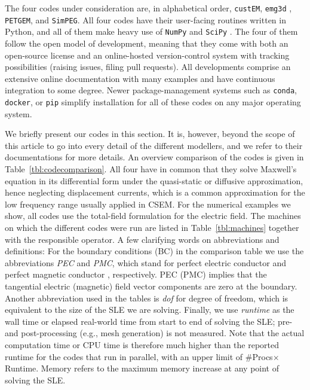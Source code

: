 \documentclass[extra, camera,%
]{gji}
\newcommand{\emg}[2]{\texttt{emg#1#2}\xspace}
\newcommand{\simpeg}{\texttt{SimPEG}\xspace}
\newcommand{\custem}{\texttt{custEM}\xspace}
\newcommand{\petgem}{\texttt{PETGEM}\xspace}
\begin{document}
The four codes under consideration are, in alphabetical order, \custem \citep{GEO.19.Rochlitz}, \emg3d \citep{JOSS.19.Werthmuller}, \petgem \citep{CAG.18.CastilloReyes, GJI.19.CastilloReyes}, and \simpeg \citep{CAG.15.Cockett, CAG.17.Heagy}. All four codes have their user-facing routines written in Python, and all of them make heavy use of \texttt{NumPy} \citep{NAT.20.Harris} and \texttt{SciPy} \citep{NM.20.Virtanen}. The four of them follow the open model of development, meaning that they come with both an open-source license and an online-hosted version-control system with tracking possibilities (raising issues, filing pull requests). All developments comprise an extensive online documentation with many examples and have continuous integration to some degree. Newer package-management systems such as \texttt{conda}, \texttt{docker}, or \texttt{pip} simplify installation for all of these codes on any major operating system.

We briefly present our codes in this section. It is, however, beyond the scope of this article to go into every detail of the different modellers, and we refer to their documentations for more details. An overview comparison of the codes is given in Table~\ref{tbl:codecomparison}. All four have in common that they solve Maxwell's equation in its differential form under the quasi-static or diffusive approximation, hence neglecting displacement currents, which is a common approximation for the low frequency range usually applied in CSEM. For the numerical examples we show, all codes use the total-field formulation for the electric field. The machines on which the different codes were run are listed in Table~\ref{tbl:machines} together with the responsible operator. A few clarifying words on abbreviations and definitions: For the boundary conditions (BC) in the comparison table we use the abbreviations \emph{PEC} and \emph{PMC}, which stand for perfect electric conductor
and perfect magnetic conductor%
, respectively. PEC (PMC) implies that the tangential electric (magnetic) field vector components are zero at the boundary. Another abbreviation used in the tables is \emph{dof} for degree of freedom, which is equivalent to the size of the SLE we are solving. Finally, we use \emph{runtime} as the wall time or elapsed real-world time from start to end of solving the SLE; pre- and post-processing (e.g., mesh generation) is not measured. Note that the actual computation time or CPU time is therefore much higher than the reported runtime for the codes that run in parallel, with an upper limit of \#Procs$\times$Runtime. Memory refers to the maximum memory increase at any point of solving the SLE.
\end{document}
